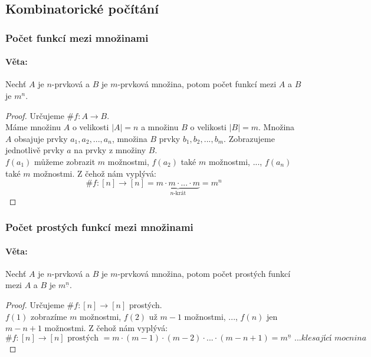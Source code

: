 \documentclass[10pt,a4paper]{article}
\begin{document}
\subsection{Kombinatorické počítání}

\subsubsection{Počet funkcí mezi množinami}
\paragraph*{Věta: } Nechť $A$ je $n$-prvková a $B$ je $m$-prvková množina, potom počet funkcí mezi $A$ a $B$ je $m^n$.

\begin{proof}
    Určujeme $\# f: A\to B$. \\Máme množinu $A$ o velikosti $|A|=n$ a množinu $B$ o velikosti $|B|=m$. Množina $A$ obsajuje prvky $a_1, a_2, ..., a_n$, množina $B$ prvky $b_1, b_2, ..., b_m$. Zobrazujeme jednotlivě prvky $a$ na prvky z množiny $B$.\\
    $f(a_1)$ můžeme zobrazit $m$ možnostmi, $f(a_2)$ také $m$ možnostmi, ..., $f(a_n)$ také $m$ možnostmi. Z čehož nám vyplývá:
    \[
        \#f:[n]\to [n] = \underbrace{m\cdot m\cdot ... \cdot m}_{n\text{-krát}} = m^n
    \]  
\end{proof}

\subsubsection{Počet prostých funkcí mezi množinami}
\paragraph*{Věta: } Nechť $A$ je $n$-prvková a $B$ je $m$-prvková množina, potom počet prostých funkcí mezi $A$ a $B$ je $m^{\underline{n}}$.

\begin{proof} Určujeme $\# f: [n]\to [n]$ prostých.\\
    $f(1)$ zobrazíme $m$ možnostmi, $f(2)$ už $m-1$ možnostmi, ..., $f(n)$ jen $m-n+1$ možnostmi. Z čehož nám vyplývá:
    \[
        \#f:[n]\to [n] \text{ prostých } =m\cdot (m-1)\cdot (m-2) \cdot ... \cdot (m-n+1) = m^{\underline{n}} \textit{ ...klesající mocnina}
    \]
\end{proof}

\end{document}
